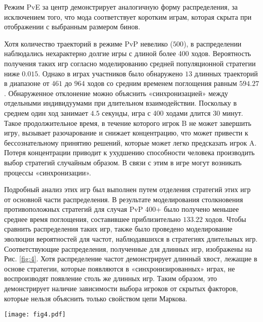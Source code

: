 Режим PvE за центр демонстрирует аналогичную форму распределения, за исключением того, что мода соответствует коротким играм, 
которая скрыта при отображении с выбранным размером бинов.

Хотя количество траекторий в режиме PvP невелико ($500$), в распределении наблюдались нехарактерно долгие игры с длиной более 400 ходов. 
Вероятность получения таких игр согласно моделированию средней популяционной стратегии ниже $0.015$. 
Однако в играх участников было обнаружено $13$ длинных траекторий в диапазоне от $461$ до $964$ ходов со средним временем поглощения равным $594.27$. 
Обнаруженное отклонение можно объяснить «синхронизацией» между отдельными индивидуумами при длительном взаимодействии. 
Поскольку в среднем один ход занимает $4.5$ секунды, игра с 400 ходами длится 30 минут. 
Такое продолжительное время, в течение которого игрок B не может завершить игру, вызывает разочарование и снижает концентрацию, 
что может привести к бессознательному принятию решений, которые может легко предсказать игрок A. 
Потеря концентрации приводит к ухудшению способности человека производить выбор стратегий случайным образом. 
В связи с этим в игре могут возникать процессы «синхронизации».

Подробный анализ этих игр был выполнен путем отделения стратегий этих игр от основной части распределения. 
В результате моделирования столкновения противоположных стратегий для случая PvP 400+ было получено меньшее среднее время поглощения, составившее приблизительно $133.22$ ходов. 
Чтобы сравнить распределения таких игр, также было проведено моделирование эволюции вероятностей для частот, наблюдавшихся в стратегиях длительных игр. 
Соответствующие распределения, полученные для длинных игр, изображены на Рис. \ref{fig:4}. Хотя распределение частот демонстрирует длинный хвост, 
лежащие в основе стратегии, которые появляются в «синхронизированных» играх, не воспроизводят появление столь же длинных игр. 
Таким образом, это демонстрирует наличие зависимости выбора игроков от скрытых факторов, которые нельзя объяснить только свойством цепи Маркова.


\begin{figure*}[t]
    \begin{center}
    \texttt{[image: fig4.pdf]}
    \caption{
        Распределение времени поглощения для режима PvP (желтая гистограмма и фиолетовая линия) 
        по сравнению с моделированием частот направлений движения (зеленая линия) и частот стратегий (синяя линия), 
        наблюдаемых в длительных играх (более 400 ходов). Частоты направлений движения для каждого состояния, полученные в 
        экспериментальных длинных играх, использовались для моделирования эволюции вероятностей найти фишку в узлах решетки. 
        Стратегии обоих игроков A и B в PvP с длиной ходов более 400 использовались отдельно при моделировании.
    }  
    \label{fig:4}
    \end{center}
\end{figure*}


